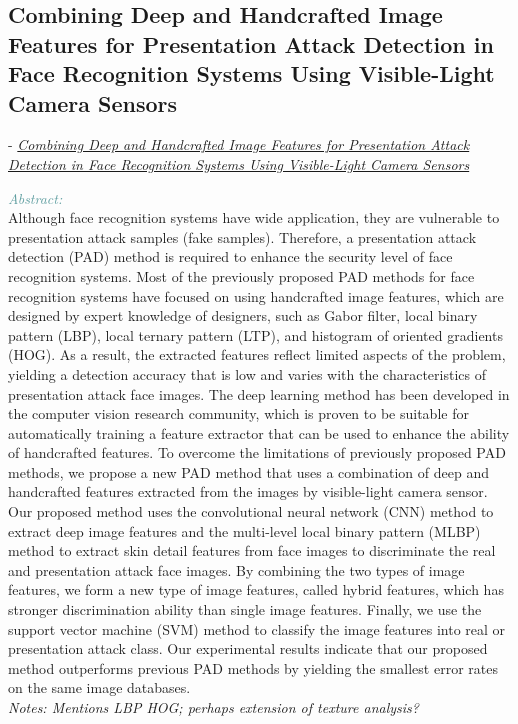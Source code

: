 \documentclass[]{article}
\newcommand{\paperentry}[4]{
            \hangindent=1cm
            \cite{#1} - \href{run:../References/#3}{\textcolor{Sepia}{\textit{#2}}}
            
            \noindent            
            \begin{minipage}[t]{0.1\linewidth}\hfill\end{minipage}
            \begin{minipage}[t]{0.8\linewidth}\textcolor{CadetBlue}{{\textit{Abstract:}}}\\#4\end{minipage}
            \vspace{.25cm}
          }
\begin{document}
  \subsection{Combining Deep and Handcrafted Image Features for Presentation Attack Detection in Face Recognition Systems Using Visible-Light Camera Sensors}
 \paperentry{Nguyen2018Face}
 {Combining Deep and Handcrafted Image Features for Presentation Attack Detection in Face Recognition Systems Using Visible-Light Camera Sensors}
 {Existing Approaches to Texture Analysis/Deep neural networks for texture classification—A theoretical analysis.pdf}
 {Although face recognition systems have wide application, they are vulnerable to presentation attack samples (fake samples). Therefore, a presentation attack detection (PAD) method is required to enhance the security level of face recognition systems. Most of the previously proposed PAD methods for face recognition systems have focused on using handcrafted image features, which are designed by expert knowledge of designers, such as Gabor filter, local binary pattern (LBP), local ternary pattern (LTP), and histogram of oriented gradients (HOG). As a result, the extracted features reflect limited aspects of the problem, yielding a detection accuracy that is low and varies with the characteristics of presentation attack face images. The deep learning method has been developed in the computer vision research community, which is proven to be suitable for automatically training a feature extractor that can be used to enhance the ability of handcrafted features. To overcome the limitations of previously proposed PAD methods, we propose a new PAD method that uses a combination of deep and handcrafted features extracted from the images by visible-light camera sensor. Our proposed method uses the convolutional neural network (CNN) method to extract deep image features and the multi-level local binary pattern (MLBP) method to extract skin detail features from face images to discriminate the real and presentation attack face images. By combining the two types of image features, we form a new type of image features, called hybrid features, which has stronger discrimination ability than single image features. Finally, we use the support vector machine (SVM) method to classify the image features into real or presentation attack class. Our experimental results indicate that our proposed method outperforms previous PAD methods by yielding the smallest error rates on the same image databases.
 	\\\emph{Notes: Mentions LBP HOG; perhaps extension of texture analysis?}} \\ 
 
\newpage



\end{document}
